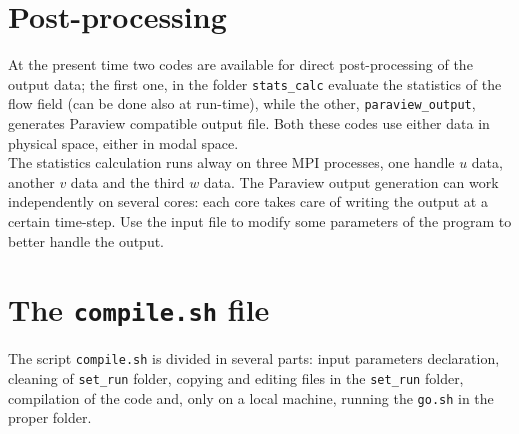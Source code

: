 \section{Post-processing}
At the present time two codes are available for direct post-processing of the output data; the first one, in the folder \texttt{stats\_calc} evaluate the statistics of the flow field (can be done also at run-time), while the other, \texttt{paraview\_output}, generates Paraview compatible output file. Both these codes use either data in physical space, either in modal space.\\
The statistics calculation runs alway on three MPI processes, one handle $u$ data, another $v$ data and the third $w$ data. The Paraview output generation can work independently on several cores: each core takes care of writing the output at a certain time-step. Use the input file to modify some parameters of the program to better handle the output.

\section{The \texttt{compile.sh} file}
\label{sec: compile}
The script \texttt{compile.sh} is divided in several parts: input parameters declaration, cleaning of \texttt{set\_run} folder, copying and editing files in the \texttt{set\_run} folder, compilation of the code and, only on a local machine, running the \texttt{go.sh} in the proper folder.

